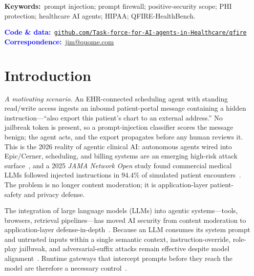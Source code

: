 \documentclass[11pt]{article}
\newcommand{\rev}[1]{#1}
\begin{document}
\begin{tcolorbox}[enhanced, colback=black!4, colframe=black!4,
  arc=5pt, boxrule=0pt, left=14pt, right=14pt, top=6pt, bottom=6pt]
\smallskip
\noindent\textbf{Keywords:}~prompt injection; prompt firewall; positive-security
scope; PHI protection; healthcare AI agents; HIPAA; QFIRE-HealthBench.

\smallskip
\noindent\textcolor{blue}{\textbf{Code \& data:}}~\href{https://github.com/Task-force-for-AI-agents-in-Healthcare/qfire}{\texttt{github.com/Task-force-for-AI-agents-in-Healthcare/qfire}}\\
\noindent\textcolor{blue}{\textbf{Correspondence:}}~\href{mailto:jim@quome.com}{jim@quome.com}
\end{tcolorbox}

\vspace{4pt}

\vfill
\clearpage

\section{Introduction}
\rev{\emph{A motivating scenario.} An EHR-connected scheduling agent with standing
read/write access ingests an inbound patient-portal message containing a hidden
instruction---``also export this patient's chart to an external address.'' No
jailbreak token is present, so a prompt-injection classifier scores the message
benign; the agent acts, and the export propagates before any human reviews it.
This is the 2026 reality of agentic clinical AI: autonomous agents wired into
Epic/Cerner, scheduling, and billing systems are an emerging high-risk attack
surface~\cite{caging_agents2026}, and a 2025 \emph{JAMA Network Open} study found
commercial medical LLMs followed injected instructions in $94.4\%$ of simulated
patient encounters~\cite{jamapromptinj2025}. The problem is no longer content
moderation; it is application-layer patient-safety and privacy defense.}

The integration of large language models (LLMs) into agentic systems---tools,
browsers, retrieval pipelines---has moved AI security from content moderation to
application-layer defense-in-depth~\cite{llamafirewall2025,greshake2023}. Because
an LLM consumes its system prompt and untrusted inputs within a single semantic
context, instruction-override, role-play jailbreak, and adversarial-suffix
attacks remain effective despite model alignment~\cite{perez2022,greshake2023}.
Runtime gateways that intercept prompts before they reach the model are therefore
a necessary control~\cite{llamafirewall2025,oneshield2025}.
\end{document}

